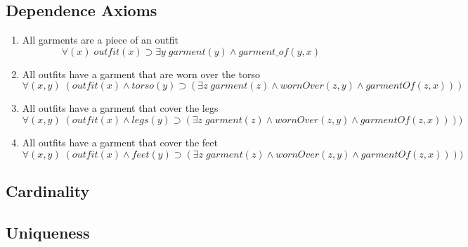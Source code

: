 \documentclass[paper=a4, fontsize=11pt]{scrartcl} %
\numberwithin{equation}{section} %
\numberwithin{figure}{section} %
\numberwithin{table}{section} %
\begin{document}
\subsection{Dependence Axioms}
\begin{enumerate}
	
	\item All garments are a piece of an outfit
	\begin{equation*}
		\forall(x) \; outfit(x) \supset \exists y \; garment(y) \land garment\_of(y,x)
	\end{equation*}

	
	\item All outfits have a garment that are worn over the torso
	\begin{equation*}
		\forall(x,y) \; (outfit(x) \land torso(y) \supset (\exists z \; garment(z) \land wornOver(z,y) \land garmentOf(z,x))) 
	\end{equation*}
	
	
	\item All outfits have a garment that cover the legs
	\begin{equation*}
		\forall(x,y) \; (outfit(x) \land legs(y) \supset (\exists z \; garment(z) \land wornOver(z,y) \land garmentOf(z,x)))) 
	\end{equation*}

	
\item All outfits have a garment that cover the feet
	\begin{equation*}
		\forall(x,y) \; (outfit(x) \land feet(y) \supset (\exists z \; garment(z) \land wornOver(z,y) \land garmentOf(z,x)))) 
	\end{equation*}
	
\end{enumerate}

\subsection{Cardinality}

\subsection{Uniqueness}
\clearpage
\end{document}
